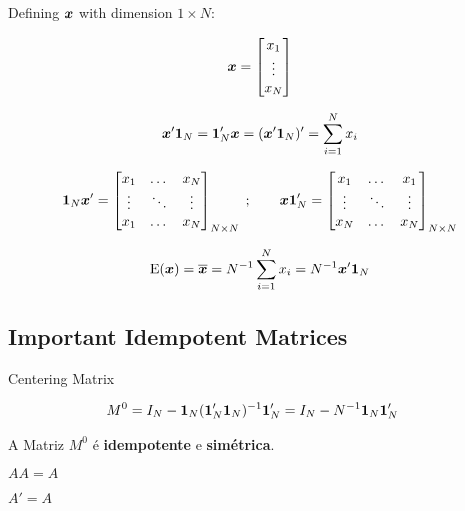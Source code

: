 \documentclass[11pt, oneside, a4paper, article]{article}
\numberwithin{equation}{section}
\begin{document}
\begin{description}
\begin{description}
Defining $\boldsymbol{x}$ with dimension $1 \times N$:

\begin{align*}
\boldsymbol{x} = 
\begin{bmatrix}
x_{1} \\ \vdots \\ x_{N}	
\end{bmatrix}
\end{align*}

\begin{align*}
\boldsymbol{x}' \boldsymbol{1}_{N} = 
\boldsymbol{1}_{N}' \boldsymbol{x} = 
(\boldsymbol{x}' \boldsymbol{1}_{N})' = 
\sum_{i=1}^{N} x_{i}
\end{align*}

\begin{align*}
\boldsymbol{1}_{N} \boldsymbol{x}' =
\begin{bmatrix}
	x_{1} & \dots & x_{N} \\
	\vdots & \ddots & \vdots \\
	x_{1} & \dots & x_{N}	
\end{bmatrix}_{N \times N}
\; ; \qquad
\boldsymbol{x} \boldsymbol{1}_{N}' =
\begin{bmatrix}
	x_{1} & \dots & x_{1} \\
	\vdots & \ddots & \vdots \\
	x_{N} & \dots & x_{N}	
\end{bmatrix}_{N \times N}
\end{align*}

\begin{align*}
\text{E}( \boldsymbol{x} ) = \overline{\boldsymbol{x}} = N^{-1} \sum_{i=1}^{N} x_{i} = N^{-1} \boldsymbol{x}'\boldsymbol{1}_{N}
\end{align*}

\subsection*{Important Idempotent Matrices}
\noindent
\cite[p. 978, A.28]{greene-7ed}

Centering Matrix

\vspace{-1 em}
\begin{align*}
	M^{0} &= 
	I_{N} - \boldsymbol{1}_{N} ( \boldsymbol{1}_{N}' \boldsymbol{1}_{N} )^{-1} \boldsymbol{1}_{N}'
	= 
	I_{N} - N^{-1} \boldsymbol{1}_{N} \boldsymbol{1}_{N}' 
\end{align*}

A Matriz $M^{0}$ é \textbf{idempotente} e \textbf{simétrica}.

\begin{description}\itemsep0pt
\item [Idempotência:] $AA = A$
\item [Simetria:] $A'=A$
\end{description}



\end{description}
\end{description}
\end{document}
